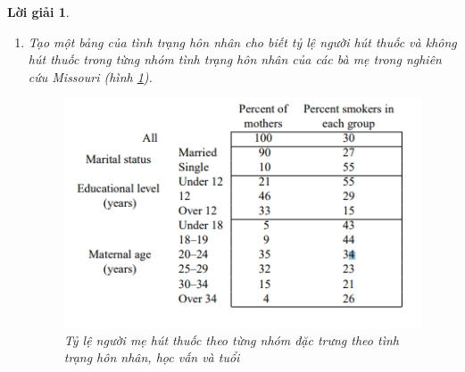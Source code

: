\documentclass[14pt, a4paper]{article}
\theoremstyle{sltheorem}
\theoremstyle{soltheorem}
\newtheorem*{loigiai}{Lời giải}
\begin{document}
\begin{loigiai}
\begin{enumerate}[wide, labelwidth=!, labelindent=0pt,label=\textbf{\arabic*}.]
        \begin{equation*}
            \begin{aligned}
                P (Z < Q_1 - 1.5 \times IQR \cup Z > Q_3 + 1.5 \times IQR) &= P (Z < Q_1 - 1.5 \times IQR) + P (Z > Q_3 + 1.5 \times IQR) \\
                &= P(Z < -0.6745 - 1.5 \times 1.349) + P (Z > 0.6745 + 1.5 \times 1.349) \\
                &= P(Z < -2.648) + P (Z > 2.698) \\
                &= \Phi(-2.698) + (1 - \Phi(2.698)) \\
                &= (1 - \Phi(2.698)) + (1 - \Phi(2.698)) \\
                &= 2 \times (1 - \Phi(2.698)) \\
                &= 0.00698 = 0.698 \%
            \end{aligned}
        \end{equation*}

        Như vậy tỷ lệ số quan sát nằm ngoài whisker của một đồ thị whisker and box là 0.698 \%.
        Và như vậy chỉ có khoảng 1 quan sát nằm ngoài whisker của một đồ thị whisker and box.

        \item Tạo một bảng của tình trạng hôn nhân cho biết tỷ lệ người hút thuốc và không hút thuốc trong từng nhóm tình trạng hôn nhân của các bà mẹ trong nghiên cứu Missouri (hình \ref{fig:Table1.16}).
        \begin{figure}[h!]
            \centering
            \includegraphics[scale=0.8]{Table1.6.png}
            \caption{Tỷ lệ người mẹ hút thuốc theo từng nhóm đặc trưng theo tình trạng hôn nhân, học vấn và tuổi}
            \label{fig:Table1.16}
        \end{figure}


\end{enumerate}
\end{loigiai}
\end{document}
